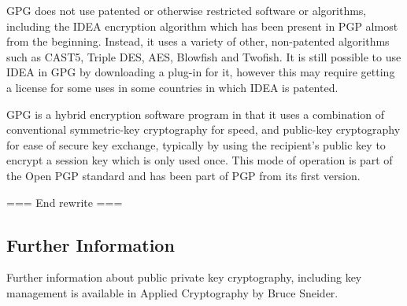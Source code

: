 GPG does not use patented or otherwise restricted software or
algorithms, including the IDEA encryption algorithm which has been
present in PGP almost from the beginning. Instead, it uses a variety of
other, non-patented algorithms such as CAST5, Triple DES, AES, Blowfish
and Twofish. It is still possible to use IDEA in GPG by downloading a
plug-in for it, however this may require getting a license for some uses
in some countries in which IDEA is patented.

GPG is a hybrid encryption software program in that it uses a
combination of conventional symmetric-key cryptography for speed, and
public-key cryptography for ease of secure key exchange, typically by
using the recipient's public key to encrypt a session key which is only
used once. This mode of operation is part of the Open PGP standard and
has been part of PGP from its first version.

=== End rewrite ===

\subsection{Further Information}

Further information about public private key cryptography, including key
management is available in Applied Cryptography by Bruce Sneider.
